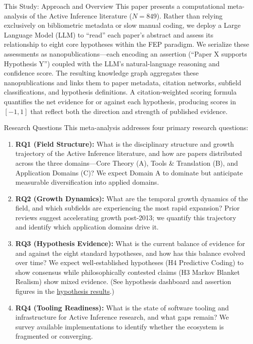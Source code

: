 \documentclass[
  ignorenonframetext,
]{beamer}
\providecommand{\tightlist}{%
  \setlength{\itemsep}{0pt}\setlength{\parskip}{0pt}}
\begin{document}
\begin{frame}{This Study: Approach and Overview}
\protect{}\label{this-study-approach-and-overview}
This paper presents a computational meta-analysis of the Active
Inference literature (\(N = 849\)). Rather than relying exclusively on
bibliometric metadata or slow manual coding, we deploy a Large Language
Model (LLM) to ``read'' each paper's abstract and assess its
relationship to eight core hypotheses within the FEP paradigm. We
serialize these assessments as nanopublications---each encoding an
assertion (``Paper X supports Hypothesis Y'') coupled with the LLM's
natural-language reasoning and confidence score. The resulting knowledge
graph aggregates these nanopublications and links them to paper
metadata, citation networks, subfield classifications, and hypothesis
definitions. A citation-weighted scoring formula quantifies the net
evidence for or against each hypothesis, producing scores in \([-1, 1]\)
that reflect both the direction and strength of published evidence.
\end{frame}

\begin{frame}{Research Questions}
\protect{}\label{research-questions}
This meta-analysis addresses four primary research questions:

\begin{enumerate}
\tightlist
\item
  \textbf{RQ1 (Field Structure):} What is the disciplinary structure and
  growth trajectory of the Active Inference literature, and how are
  papers distributed across the three domains---Core Theory (A), Tools
  \& Translation (B), and Application Domains (C)? We expect Domain A to
  dominate but anticipate measurable diversification into applied
  domains.
\item
  \textbf{RQ2 (Growth Dynamics):} What are the temporal growth dynamics
  of the field, and which subfields are experiencing the most rapid
  expansion? Prior reviews suggest accelerating growth post-2013; we
  quantify this trajectory and identify which application domains drive
  it.
\item
  \textbf{RQ3 (Hypothesis Evidence):} What is the current balance of
  evidence for and against the eight standard hypotheses, and how has
  this balance evolved over time? We expect well-established hypotheses
  (H4 Predictive Coding) to show consensus while philosophically
  contested claims (H3 Markov Blanket Realism) show mixed evidence. (See
  hypothesis dashboard and assertion figures in the
  \hyperref[sec:hypothesis_results]{hypothesis results}.)
\item
  \textbf{RQ4 (Tooling Readiness):} What is the state of software
  tooling and infrastructure for Active Inference research, and what
  gaps remain? We survey available implementations to identify whether
  the ecosystem is fragmented or converging.
\end{enumerate}
\end{frame}
\end{document}
